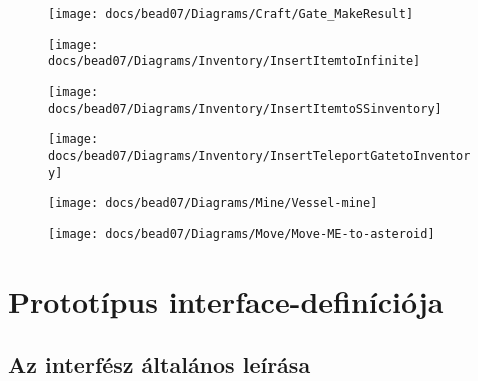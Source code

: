 \documentclass[../../projlab]{subfiles}
\begin{document}
\begin{figure}[H] 
    \centering 
    \texttt{[image: docs/bead07/Diagrams/Craft/Gate\_MakeResult]} 
    \caption{} 
\end{figure} 

\begin{figure}[H] 
    \centering 
    \texttt{[image: docs/bead07/Diagrams/Inventory/InsertItemtoInfinite]} 
    \caption{} 
\end{figure} 

\begin{figure}[H] 
    \centering 
    \texttt{[image: docs/bead07/Diagrams/Inventory/InsertItemtoSSinventory]} 
    \caption{} 
\end{figure} 

\begin{figure}[H] 
    \centering 
    \texttt{[image: docs/bead07/Diagrams/Inventory/InsertTeleportGatetoInventory]} 
    \caption{} 
\end{figure}

\begin{figure}[H] 
    \centering 
    \texttt{[image: docs/bead07/Diagrams/Mine/Vessel-mine]} 
    \caption{} 
\end{figure} 

\begin{figure}[H] 
    \centering 
    \texttt{[image: docs/bead07/Diagrams/Move/Move-ME-to-asteroid]} 
    \caption{} 
\end{figure} 


\section{Prototípus interface-definíciója}

\subsection{Az interfész általános leírása}
\end{document}
